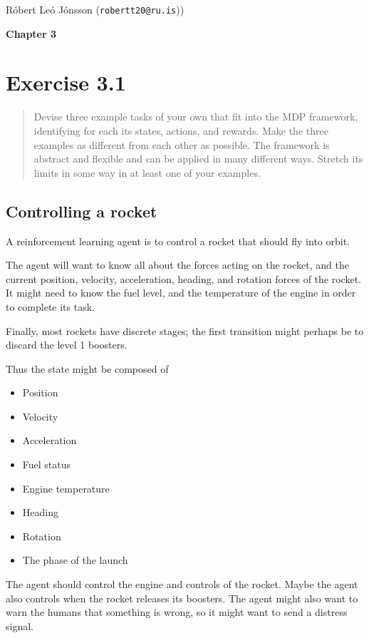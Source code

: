 \documentclass[a4paper,11pt,reqno]{amsart}
\newcounter{temp}
\newcommand{\rubrik}[1]{\bigskip \begin{center}{\bf #1}\end{center} \medskip}
\begin{document}
\pagestyle{empty}
\thispagestyle{empty}

{\small{\sc\noindent
        Róbert Leó Jónsson ({\tt robertt20@ru.is}))
}}

\rubrik{Chapter 3}

\section*{Exercise 3.1}
\begin{quote}
Devise three example tasks of your own that fit into the MDP framework, identifying for each its states, actions, and rewards. Make the three examples as different from each other as possible. The framework is abstract and flexible and can be applied in many different ways. Stretch its limits in some way in at least one of your examples.  
\end{quote}

\subsection*{Controlling a rocket}
A reinforcement learning agent is to control a rocket that should fly into orbit. 

The agent will want to know all about the forces acting on the rocket, and the current position, velocity, acceleration, heading, and rotation forces of the rocket. It might need to know the fuel level, and the temperature of the engine in order to complete its task.

Finally, most rockets have discrete stages; the first transition might perhaps be to discard the level 1 boosters. 

Thus the state might be composed of
\begin{itemize}
    \item   Position
    \item   Velocity
    \item   Acceleration
    \item   Fuel status
    \item   Engine temperature
    \item   Heading
    \item   Rotation
    \item   The phase of the launch
\end{itemize}

The agent should control the engine and controls of the rocket. Maybe the agent also controls when the rocket releases its boosters. The agent might also want to warn the humans that something is wrong, so it might want to send a distress signal.
\end{document}
